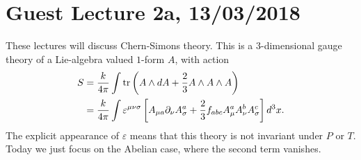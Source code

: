 \section*{Guest Lecture 2a, 13/03/2018}
These lectures will discuss Chern-Simons theory.
This is a $3$-dimensional gauge theory of a Lie-algebra valued $1$-form $A$, with action
\begin{align*}
S &= \frac{k}{4 \pi} \int \operatorname{tr} \left( A \wedge dA + \frac{2}{3} A \wedge A \wedge A\right)\\
&= \frac{k}{4 \pi} \int \varepsilon^{\mu \nu \sigma} \left[A_{\mu a} \partial_\nu A_\sigma^a + \frac{2}{3} f_{abc} A_\mu^a A_\nu^b A_\sigma^c \right] d^3x.
\end{align*}
The explicit appearance of $\varepsilon$ means that this theory is not invariant under  $P$ or $T$.
Today we just focus on the Abelian case, where the second term vanishes.
